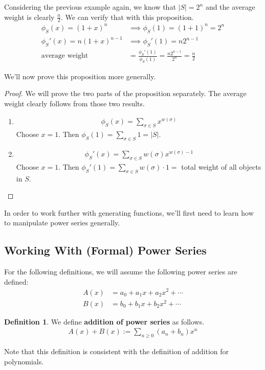 \documentclass[]{article}
\theoremstyle{definition}
\newtheorem*{defn}{Definition}
\begin{document}
			Considering the previous example again, we know that $|S| = 2^n$ and the average weight is clearly $\frac{n}{2}$. We can verify that with this proposition.
			\begin{align*}
				\phi_S(x) = (1 + x)^n &\implies \phi_S(1) = (1 + 1)^n = 2^n \\
				\phi_S'(x) = n(1 + x)^{n - 1} &\implies \phi_S'(1) = n2^{n - 1} \\
				\text{average weight } &= \frac{\phi_S'(1)}{\phi_S(1)} = \frac{n2^{n - 1}}{2^n} = \frac{n}{2}
			\end{align*}

			We'll now prove this proposition more generally.
			\begin{proof}
				We will prove the two parts of the proposition separately. The average weight clearly follows from those two results.
				\begin{enumerate}
					\item
						\begin{align*}
							\phi_S(x) = \sum_{\sigma \in S} x^{w(\sigma)}
						\end{align*}
						Choose $x = 1$. Then $\phi_S(1) = \sum_{\sigma \in S} 1 = |S|$.

					\item
						\begin{align*}
							\phi_S'(x) = \sum_{\sigma \in S} w(\sigma)x^{w(\sigma) - 1}
						\end{align*}
						Choose $x = 1$. Then $\phi_S'(1) = \sum_{\sigma \in S} w(\sigma) \cdot 1 = $ total weight of all objects in $S$.
				\end{enumerate}
			\end{proof}

			In order to work further with generating functions, we'll first need to learn how to manipulate power series generally.
		\subsection{Working With (Formal) Power Series}
			For the following definitions, we will assume the following power series are defined:
			\begin{align*}
				A(x) &= a_0 + a_1x + a_2x^2 + \cdots \\
				B(x) &= b_0 + b_1x + b_2x^2 + \cdots
			\end{align*}

			\begin{defn}
				We define \textbf{addition of power series} as follows.
				\begin{align*}
					A(x) + B(x) := \sum_{n \ge 0} (a_n + b_n)x^n
				\end{align*}

				Note that this definition is consistent with the definition of addition for polynomials.
			\end{defn}
\end{document}
